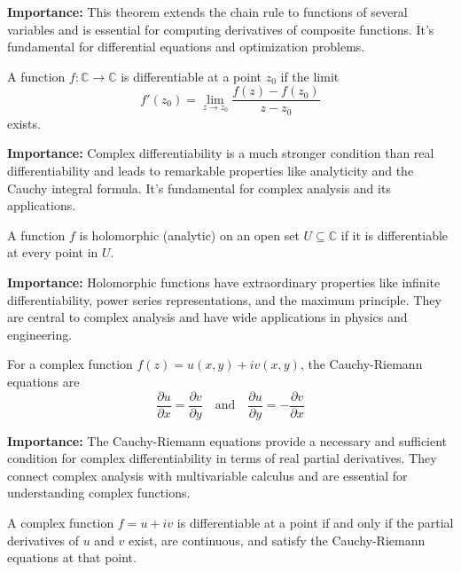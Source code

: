 \noindent\textbf{Importance:} This theorem extends the chain rule to functions of several variables and is essential for computing derivatives of composite functions. It's fundamental for differential equations and optimization problems.



\begin{definition}
A function $f: \mathbb{C} \to \mathbb{C}$ is differentiable at a point $z_0$ if the limit
\[ f'(z_0) = \lim_{z \to z_0} \frac{f(z) - f(z_0)}{z - z_0} \]
exists.
\end{definition}

\noindent\textbf{Importance:} Complex differentiability is a much stronger condition than real differentiability and leads to remarkable properties like analyticity and the Cauchy integral formula. It's fundamental for complex analysis and its applications.



\begin{definition}
A function $f$ is holomorphic (analytic) on an open set $U \subseteq \mathbb{C}$ if it is differentiable at every point in $U$.
\end{definition}

\noindent\textbf{Importance:} Holomorphic functions have extraordinary properties like infinite differentiability, power series representations, and the maximum principle. They are central to complex analysis and have wide applications in physics and engineering.



\begin{definition}
For a complex function $f(z) = u(x,y) + iv(x,y)$, the Cauchy-Riemann equations are
\[ \frac{\partial u}{\partial x} = \frac{\partial v}{\partial y} \quad \text{and} \quad \frac{\partial u}{\partial y} = -\frac{\partial v}{\partial x} \]
\end{definition}

\noindent\textbf{Importance:} The Cauchy-Riemann equations provide a necessary and sufficient condition for complex differentiability in terms of real partial derivatives. They connect complex analysis with multivariable calculus and are essential for understanding complex functions.



\begin{theorem}
A complex function $f = u + iv$ is differentiable at a point if and only if the partial derivatives of $u$ and $v$ exist, are continuous, and satisfy the Cauchy-Riemann equations at that point.
\end{theorem}

